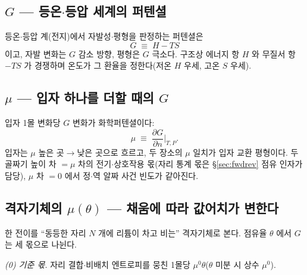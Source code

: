 \documentclass[11pt,a4paper]{article}
\begin{document}
\subsection{$G$ — 등온$\cdot$등압 세계의 퍼텐셜}
등온$\cdot$등압 계(전지)에서 자발성$\cdot$평형을 판정하는 퍼텐셜은
\begin{equation}
G\;\equiv\;H-TS
\label{eq:gibbsdef}
\end{equation}
이고, 자발 변화는 $G$ 감소 방향, 평형은 $G$ 극소다. 구조상 에너지 항 $H$ 와 무질서 항 $-TS$ 가 경쟁하며 온도가 그 환율을 정한다(저온 $H$ 우세, 고온 $S$ 우세).

\subsection{$\mu$ — 입자 하나를 더할 때의 $G$}
입자 1몰 변화당 $G$ 변화가 화학퍼텐셜이다:
\begin{equation}
\mu\;\equiv\;\frac{\partial G}{\partial n}\Big|_{T,P}.
\label{eq:mudef}
\end{equation}
입자는 $\mu$ 높은 곳$\to$낮은 곳으로 흐르고, 두 장소의 $\mu$ 일치가 입자 교환 평형이다. 두 골짜기 높이 차 $=\mu$ 차의 전기$\cdot$상호작용 몫(자리 통계 몫은 \S\ref{sec:fwdrev} 점유 인자가 담당), $\mu$ 차 $=0$ 에서 정$\cdot$역 알짜 사건 빈도가 같아진다.

\subsection{격자기체의 $\mu(\theta)$ — 채움에 따라 값어치가 변한다}
한 전이를 ``동등한 자리 $N$ 개에 리튬이 차고 비는'' 격자기체로 본다. 점유율 $\theta$ 에서 $G$ 는 세 몫으로 나뉜다.

\emph{(0) 기준 몫.} 자리 결합$\cdot$비배치 엔트로피를 뭉친 1몰당 $\mu^0\theta$($\theta$ 미분 시 상수 $\mu^0$).
\end{document}
